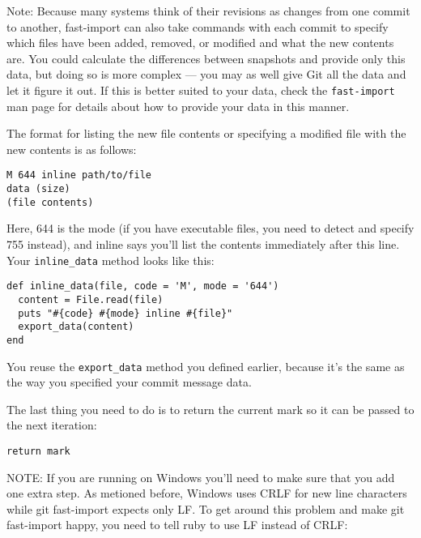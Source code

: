 \documentclass[a4paper]{book}
\newcounter{tab}[chapter]
\begin{document}
Note: Because many systems think of their revisions as changes from one commit to another, fast-import can also take commands with each commit to specify which files have been added, removed, or modified and what the new contents are. You could calculate the differences between snapshots and provide only this data, but doing so is more complex --- you may as well give Git all the data and let it figure it out. If this is better suited to your data, check the \texttt{fast-import} man page for details about how to provide your data in this manner.

The format for listing the new file contents or specifying a modified file with the new contents is as follows:

\begin{shaded}\begin{verbatim}
M 644 inline path/to/file
data (size)
(file contents)
\end{verbatim}\end{shaded}

Here, 644 is the mode (if you have executable files, you need to detect and specify 755 instead), and inline says you'll list the contents immediately after this line. Your \texttt{inline\_data} method looks like this:

\begin{shaded}\begin{verbatim}
def inline_data(file, code = 'M', mode = '644')
  content = File.read(file)
  puts "#{code} #{mode} inline #{file}"
  export_data(content)
end
\end{verbatim}\end{shaded}

You reuse the \texttt{export\_data} method you defined earlier, because it's the same as the way you specified your commit message data.

The last thing you need to do is to return the current mark so it can be passed to the next iteration:

\begin{shaded}\begin{verbatim}
return mark
\end{verbatim}\end{shaded}

NOTE: If you are running on Windows you'll need to make sure that you add one extra step. As metioned before, Windows uses CRLF for new line characters while git fast-import expects only LF. To get around this problem and make git fast-import happy, you need to tell ruby to use LF instead of CRLF:
\end{document}
